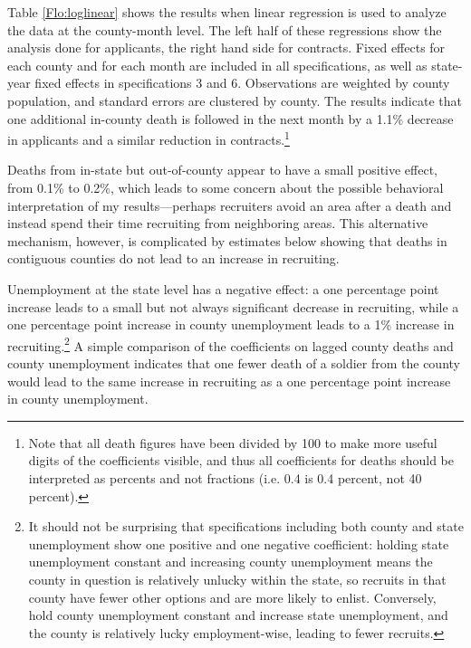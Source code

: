 \documentclass[12pt] {article}
\begin{document}
Table \ref{Flo:loglinear}
shows the results when linear regression is used to analyze the data
at the county-month level. The left half of these regressions show the analysis done for applicants, the right hand side for contracts. %
Fixed effects for each county and for each month are included in all specifications, as well as state-year fixed effects  in specifications 3 and 6.
Observations are weighted by county population, and standard errors
are clustered by county. The results indicate that one additional
in-county death is followed in the next month by a 1.1\%
decrease in applicants and a similar reduction in contracts.\footnote{Note that all death figures have been divided by 100 to make more
useful digits of the coefficients visible, and thus all coefficients
for deaths should be interpreted as percents and not fractions (i.e.
0.4 is 0.4 percent, not 40 percent).} 

Deaths from in-state but out-of-county
appear to have a small positive effect, from 0.1\% to 0.2\%, which leads to some concern about the possible behavioral interpretation of my results---perhaps recruiters avoid an area after a death and instead spend their time recruiting from neighboring areas. This alternative mechanism, however, is complicated by estimates below showing that deaths in contiguous counties do not lead to an increase in recruiting. 

Unemployment at the state level has a negative effect: a one percentage point increase leads to a small but not always significant decrease in recruiting,
while a one percentage point increase in county unemployment leads
to a 1\% increase in recruiting.\footnote{It should not be surprising that specifications including both county and state unemployment show one positive and one negative coefficient: holding state unemployment constant and increasing county unemployment means the county in question is relatively unlucky within the state, so recruits in that county have fewer other options and are more likely to enlist. Conversely, hold county unemployment constant and increase state unemployment, and the county is relatively lucky employment-wise, leading to fewer recruits.}  A simple comparison of the coefficients on lagged county deaths and county unemployment indicates that one fewer death of a soldier from the county would lead to the same increase in recruiting as a one percentage point increase in county unemployment.
\end{document}
